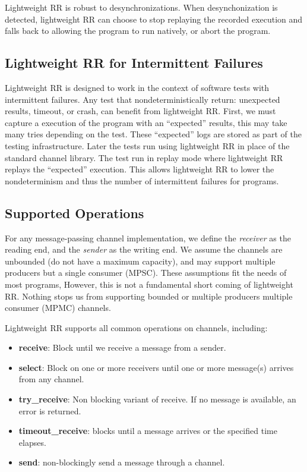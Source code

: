 Lightweight RR is robust to desynchronizations. When desynchonization is detected, lightweight RR can choose to stop replaying the recorded execution and falls back to allowing the program to run natively, or abort the program.

\subsection{Lightweight RR for Intermittent Failures}
Lightweight RR is designed to work in the context of software tests with intermittent
failures.
Any test that nondeterministically return: unexpected results, timeout, or crash, can
benefit from lightweight RR. First, we must capture a execution of the program with an
``expected'' results, this may take many tries depending on the test.
These ``expected'' logs are stored as part of the testing infrastructure. Later the
tests run using lightweight RR in place of the standard channel library. The test run
in replay mode where lightweight RR replays the ``expected'' execution. This allows
lightweight RR to lower the nondeterminism and thus the number of intermittent failures
for programs.

\subsection{Supported Operations}
For any message-passing channel implementation, we define the \textit{receiver} as the reading end, and the \textit{sender} as the writing end. We assume the channels are unbounded (do not have a maximum capacity), and may support multiple producers but a single consumer (MPSC). These assumptions fit the needs of most programs, However, this is not a fundamental short coming of lightweight RR. Nothing stops us from supporting bounded or multiple producers multiple consumer (MPMC) channels.

Lightweight RR supports all common operations on channels, including:
\begin{itemize}
\item  \textbf{receive}: Block until we receive a message from a sender.
\item  \textbf{select}: Block on one or more receivers until one or more message(s) arrives from any channel.
\item  \textbf{try\_receive}: Non blocking variant of receive. If no message is available, an
  error is returned.
\item  \textbf{timeout\_receive}: blocks until a message arrives or the specified time elapses.
\item  \textbf{send}: non-blockingly send a message through a channel.
\end{itemize}

